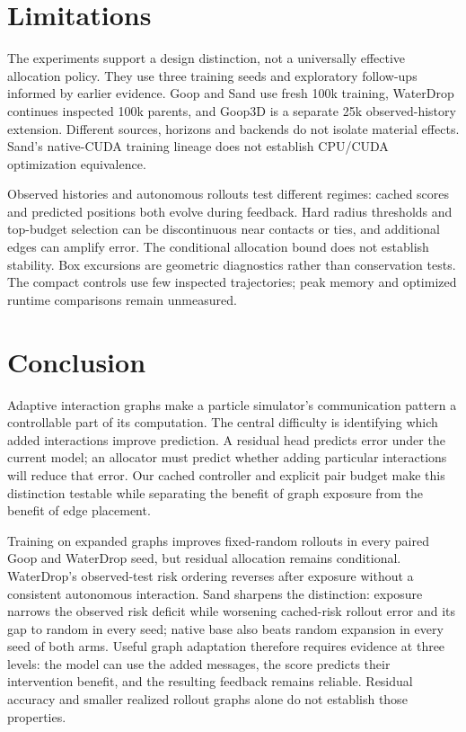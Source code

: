 \section{Limitations}
The experiments support a design distinction, not a universally effective allocation policy. They use three training seeds and exploratory follow-ups informed by earlier evidence. Goop and Sand use fresh 100k training, WaterDrop continues inspected 100k parents, and Goop3D is a separate 25k observed-history extension. Different sources, horizons and backends do not isolate material effects. Sand's native-CUDA training lineage does not establish CPU/CUDA optimization equivalence.

Observed histories and autonomous rollouts test different regimes: cached scores and predicted positions both evolve during feedback. Hard radius thresholds and top-budget selection can be discontinuous near contacts or ties, and additional edges can amplify error. The conditional allocation bound does not establish stability. Box excursions are geometric diagnostics rather than conservation tests. The compact controls use few inspected trajectories; peak memory and optimized runtime comparisons remain unmeasured.

\section{Conclusion}
Adaptive interaction graphs make a particle simulator's communication pattern a controllable part of its computation. The central difficulty is identifying which added interactions improve prediction. A residual head predicts error under the current model; an allocator must predict whether adding particular interactions will reduce that error. Our cached controller and explicit pair budget make this distinction testable while separating the benefit of graph exposure from the benefit of edge placement.

Training on expanded graphs improves fixed-random rollouts in every paired Goop and WaterDrop seed, but residual allocation remains conditional. WaterDrop's observed-test risk ordering reverses after exposure without a consistent autonomous interaction. Sand sharpens the distinction: exposure narrows the observed risk deficit while worsening cached-risk rollout error and its gap to random in every seed; native base also beats random expansion in every seed of both arms. Useful graph adaptation therefore requires evidence at three levels: the model can use the added messages, the score predicts their intervention benefit, and the resulting feedback remains reliable. Residual accuracy and smaller realized rollout graphs alone do not establish those properties.

